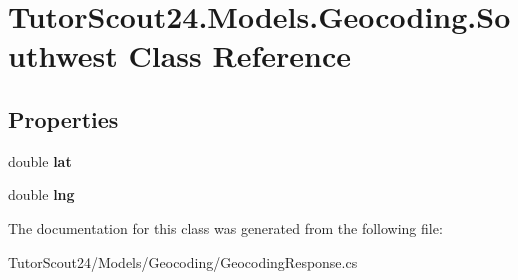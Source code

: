 \hypertarget{class_tutor_scout24_1_1_models_1_1_geocoding_1_1_southwest}{}\section{Tutor\+Scout24.\+Models.\+Geocoding.\+Southwest Class Reference}
\label{class_tutor_scout24_1_1_models_1_1_geocoding_1_1_southwest}
\subsection*{Properties}
\begin{DoxyCompactItemize}
\item 
\mbox{\label{class_tutor_scout24_1_1_models_1_1_geocoding_1_1_southwest_ab447fe14abf7821c6b18da10eec489c7}} 
double {\bfseries lat}
\item 
\mbox{\label{class_tutor_scout24_1_1_models_1_1_geocoding_1_1_southwest_a6db6fce4afc3e2ec698362ea1ef5143f}} 
double {\bfseries lng}
\end{DoxyCompactItemize}


The documentation for this class was generated from the following file\+:\begin{DoxyCompactItemize}
\item 
Tutor\+Scout24/\+Models/\+Geocoding/Geocoding\+Response.\+cs\end{DoxyCompactItemize}
